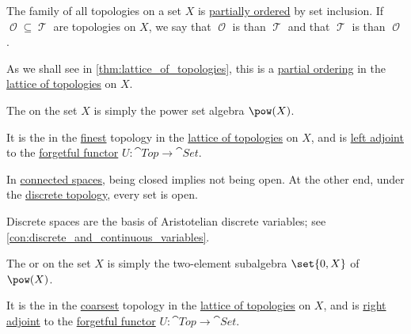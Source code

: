 \begin{definition}\label{def:topological_space_ordering}
  The family of all topologies on a set \( X \) is \hyperref[def:partially_ordered_set]{partially ordered} by set inclusion. If \( \mscrO \subseteq \mscrT \) are topologies on \( X \), we say that \( \mscrO \) is  than \( \mscrT \) and that \( \mscrT \) is  than \( \mscrO \).
\end{definition}
\begin{comments}
  \item As we shall see in \cref{thm:lattice_of_topologies}, this is a \hyperref[def:partially_ordered_set]{partial ordering} in the \hyperref[thm:lattice_of_topologies]{lattice of topologies} on \( X \).
\end{comments}

\begin{definition}\label{def:discrete_topology}
  The  on the set \( X \) is simply the power set algebra \( \pow(X) \).
\end{definition}
\begin{comments}
  \item It is the in the \hyperref[def:topological_space_ordering]{finest} topology in the \hyperref[thm:lattice_of_topologies]{lattice of topologies} on \( X \), and is \hyperref[def:adjoint_functor]{left adjoint} to the \hyperref[con:forgetful_functor]{forgetful functor} \( U: \cat{Top} \to \cat{Set} \).

  \item In \hyperref[def:connected_space]{connected spaces}, being closed implies not being open. At the other end, under the \hyperref[def:discrete_topology]{discrete topology}, every set is open.

  \item Discrete spaces are the basis of Aristotelian discrete variables; see \cref{con:discrete_and_continuous_variables}.
\end{comments}

\begin{definition}\label{def:indiscrete_topology}
  The  or  on the set \( X \) is simply the two-element subalgebra \( \set{ 0, X } \) of \( \pow(X) \).
\end{definition}
\begin{comments}
  \item It is the in the \hyperref[def:topological_space_ordering]{coarsest} topology in the \hyperref[thm:lattice_of_topologies]{lattice of topologies} on \( X \), and is \hyperref[def:adjoint_functor]{right adjoint} to the \hyperref[con:forgetful_functor]{forgetful functor} \( U: \cat{Top} \to \cat{Set} \).
\end{comments}

